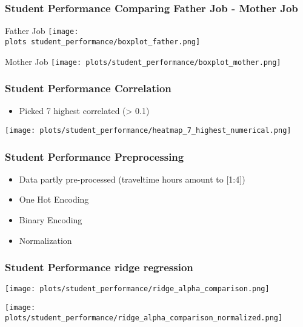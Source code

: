 \documentclass[aspectratio=169]{beamer}
\def \plots {./plots/}
\begin{document}
\begin{frame}{}
\frametitle{Student Performance Comparing Father Job - Mother Job}
\begin{minipage}{0.49\textwidth}
	\center Father Job
    \texttt{[image: \\plots student\_performance/boxplot\_father.png]}
\end{minipage}
\begin{minipage}{0.49\textwidth}
	\center Mother Job
    \texttt{[image: plots/student\_performance/boxplot\_mother.png]}
\end{minipage}
\end{frame}

\begin{frame}{}
\frametitle{Student Performance Correlation}
\begin{minipage}{0.3\textwidth}
\begin{itemize}
\item Picked 7 highest correlated (> 0.1)
\end{itemize}
\end{minipage}
\begin{minipage}{0.69\textwidth}
    \texttt{[image: plots/student\_performance/heatmap\_7\_highest\_numerical.png]}
\end{minipage}
\end{frame}

\begin{frame}{}
\frametitle{Student Performance Preprocessing}
\begin{minipage}{0.99\textwidth}
\begin{itemize}
\item Data partly pre-processed (traveltime hours amount to [1:4])
\item One Hot Encoding
\item Binary Encoding
\item Normalization
\end{itemize}
\end{minipage}
\end{frame}

\begin{frame}{}
\frametitle{Student Performance ridge regression}
\begin{minipage}{0.49\textwidth}
    \texttt{[image: plots/student\_performance/ridge\_alpha\_comparison.png]}
\end{minipage}
\begin{minipage}{0.49\textwidth}
    \texttt{[image: plots/student\_performance/ridge\_alpha\_comparison\_normalized.png]}
\end{minipage}
\end{frame}
\end{document}
